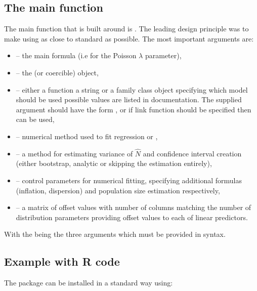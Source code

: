 \documentclass[
]{jss}
\newcommand{\1}{\mathcal{I}} \newcommand{\bZero}{\boldsymbol{0}}
\begin{document}
\subsection{The main function}\label{the-main-function}

The main function that  is built around is
. The leading design principle was to make using
 as close to standard  as
possible. The most important arguments are:

\begin{itemize}
    \item {} -- the main formula (i.e for the Poisson $\lambda$ parameter),
    \item {} -- the  (or  coercible) object,
    \item {} -- either a function a string or a family class object specifying which model should be used possible values are listed in documentation. The supplied argument should have the form ,  or if link function should be specified then  can be used,
    \item {} -- numerical method used to fit regression  or ,
    \item {} -- a method for estimating variance of $\hat{N}$ and confidence interval creation (either bootstrap, analytic or skipping the estimation entirely),
    \item {} -- control parameters for numerical fitting, specifying additional formulas (inflation, dispersion) and population size estimation respectively,
    \item {} -- a matrix of offset values with number of columns matching the number of distribution parameters providing offset values to each of linear predictors.
\end{itemize}

With the  being the three arguments which
must be provided in  syntax.

\subsection{Example with R code}\label{example-with-r-code}

The package can be installed in a standard way using:
\end{document}
